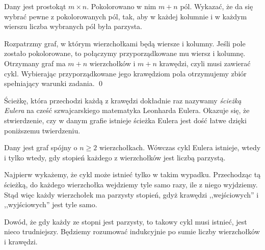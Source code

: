 \vspace{10px}



\noindent
Dany jest prostokąt $m \times n$. Pokolorowano w nim $m + n$ pól. Wykazać, że da się wybrać pewne z pokolorowanych pól, tak, aby w każdej kolumnie i w każdym wierszu liczba wybranych pól była parzysta.

\vspace{5px}


\noindent
Rozpatrzmy graf, w którym wierzchołkami będą wiersze i kolumny. Jeśli pole zostało pokolorowane, to połączymy przyporządkowane mu wiersz i kolumnę. Otrzymany graf ma $m + n$ wierzchołków i $m + n$ krawędzi, czyli musi zawierać cykl. Wybierając przyporządkowane jego krawędziom pola otrzymujemy zbiór spełniający warunki zadania.
\qed

\vspace{10px}

\noindent
Ścieżkę, która przechodzi każdą z krawędzi dokładnie raz nazywamy \textit{ścieżką Eulera} na cześć szwajcarskiego matematyka Leonharda Eulera. Okazuje się, że stwierdzenie, czy w danym grafie istnieje ścieżka Eulera jest dość łatwe dzięki poniższemu twierdzeniu.

\vspace{10px}


\noindent
Dany jest graf spójny o $n \geqslant 2$ wierzchołkach. Wówczas cykl Eulera istnieje, wtedy i tylko wtedy, gdy stopień każdego z wierzchołków jest liczbą parzystą.

\vspace{5px}


\noindent
Najpierw wykażemy, że cykl może istnieć tylko w takim wypadku. Przechodząc tą ścieżką, do każdego wierzchołka wejdziemy tyle samo razy, ile z niego wyjdziemy. Stąd więc każdy wierzchołek ma parzysty stopień, gdyż krawędzi ,,wejściowych'' i ,,wyjściowych'' jest tyle samo.

\vspace{10 px}

\noindent
Dowód, że gdy każdy ze stopni jest parzysty, to takowy cykl musi istnieć, jest nieco trudniejszy. Będziemy rozumować indukcyjnie po sumie liczby wierzchołków i krawędzi.

\vspace{5px}

